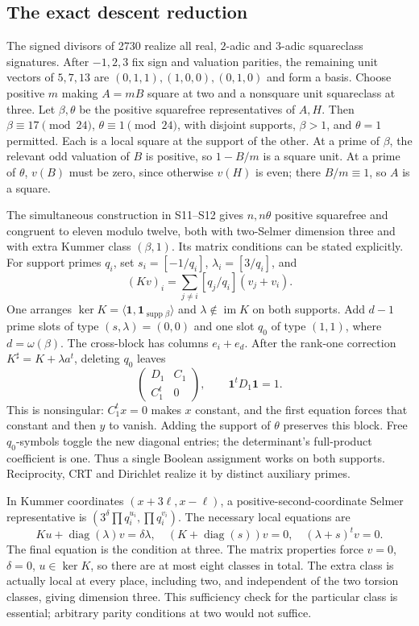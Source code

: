 \documentclass[11pt]{article}
\theoremstyle{definition}
\theoremstyle{remark}
\begin{document}
\subsection{The exact descent reduction}
The signed divisors of 2730 realize all real, $2$-adic and $3$-adic
squareclass signatures. After $-1,2,3$ fix sign and valuation parities,
the remaining unit vectors of $5,7,13$ are
$(0,1,1),(1,0,0),(0,1,0)$ and form a basis. Choose positive $m$ making
$A=mB$ square at two and a nonsquare unit squareclass at three.
Let $\beta,\theta$ be the positive squarefree representatives of $A,H$.
Then $\beta\equiv17\pmod{24}$, $\theta\equiv1\pmod{24}$, with disjoint
supports, $\beta>1$, and $\theta=1$ permitted. Each is a local square
at the support of the other. At a prime of $\beta$, the relevant odd
valuation of $B$ is positive, so $1-B/m$ is a square unit. At a prime
of $\theta$, $v(B)$ must be zero, since otherwise $v(H)$ is even;
there $B/m\equiv1$, so $A$ is a square.

The simultaneous construction in S11--S12 gives $n,n\theta$ positive
squarefree and congruent to eleven modulo twelve, both with two-Selmer
dimension three and with extra Kummer class $(\beta,1)$. Its matrix
conditions can be stated explicitly. For support primes $q_i$, set
$s_i=[-1/q_i]$, $\lambda_i=[3/q_i]$, and
\[
 (Kv)_i=\sum_{j\ne i}[q_j/q_i](v_j+v_i).
\]
One arranges $\ker K=\langle\mathbf1,\mathbf1_{\operatorname{supp}\beta}\rangle$
and $\lambda\notin\operatorname{im}K$ on both supports. Add $d-1$
prime slots of type $(s,\lambda)=(0,0)$ and one slot $q_0$ of type
$(1,1)$, where $d=\omega(\beta)$. The cross-block has columns
$e_i+e_d$. After the rank-one correction $K^\sharp=K+\lambda a^t$,
deleting $q_0$ leaves
\[
 \begin{pmatrix}D_1&C_1\\C_1^t&0\end{pmatrix},
 \qquad\mathbf1^tD_1\mathbf1=1.
\]
This is nonsingular: $C_1^tx=0$ makes $x$ constant, and the first
equation forces that constant and then $y$ to vanish. Adding the
support of $\theta$ preserves this block. Free $q_0$-symbols toggle
the new diagonal entries; the determinant's full-product coefficient
is one. Thus a single Boolean assignment works on both supports.
Reciprocity, CRT and Dirichlet realize it by distinct auxiliary primes.

In Kummer coordinates $(x+3\ell,x-\ell)$, a positive-second-coordinate
Selmer representative is $(3^\delta\prod q_i^{u_i},\prod q_i^{v_i})$.
The necessary local equations are
\[
 Ku+\operatorname{diag}(\lambda)v=\delta\lambda,\quad
 (K+\operatorname{diag}(s))v=0,\quad(\lambda+s)^tv=0.
\]
The final equation is the condition at three. The matrix properties
force $v=0$, $\delta=0$, $u\in\ker K$, so there are at most eight
classes in total. The extra class is actually local at every place,
including two, and independent of the two torsion classes, giving
dimension three. This sufficiency check for the particular class is
essential; arbitrary parity conditions at two would not suffice.
\end{document}
